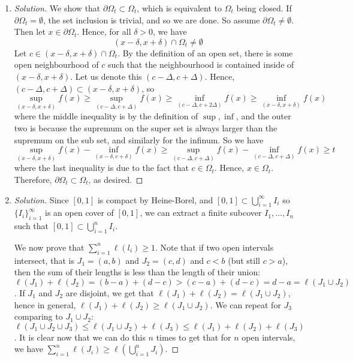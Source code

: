 \documentclass{article}
\begin{document}
\begin{enumerate}
\begin{proof}[Solution]
		Hence, $\omega_f(c) > 0$ for all $c \in [0,1]$.
	\end{proof}
	\item \begin{proof}[Solution]\let\qed\relax
		We show that $\partial \Omega_t \subset \Omega_t$,
		which is equivalent to $\Omega_t$ being closed.
		If $\partial\Omega_t = \emptyset$, the set inclusion is trivial,
		and so we are done.
		So assume $\partial \Omega_t \neq \emptyset$.
		Then let $x \in \partial \Omega_t$.
		Hence, for all $\delta > 0$, we have
		\[
			(x-\delta,x+\delta) \cap \Omega_t \neq \emptyset
		\]
		Let $c \in (x-\delta,x+\delta) \cap \Omega_t$.
		By the definition of an open set,
		there is some open neighbourhood of $c$ such that the neighbourhood is contained
		inside of $(x - \delta, x + \delta)$.
		Let us denote this $(c - \Delta, c + \Delta)$.
		Hence, $(c - \Delta, c+ \Delta) \subset (x - \delta, x+ \delta)$, so
		\[
			\sup_{(x-\delta,x+\delta)}f(x) \geq \sup_{(c-\Delta,c+\Delta)}f(x)
			\geq
			\inf_{(c-\Delta,c+2\Delta)}f(x) \geq
			\inf_{(x-\delta,x+\delta)}f(x)
		\]
		where the middle inequality is by the definition of $\sup,\inf$,
		and the outer two is because the supremum on the super set is always larger
		than the supremum on the sub set, and similarly for the infinum.
		So we have
		\[
			\sup_{(x-\delta,x+\delta)}f(x) - \inf_{(x-\delta,c+\delta)}f(x)
			\geq 
			\sup_{(c-\Delta,c+\Delta)}f(x) - \inf_{(c-\Delta,c+\Delta)}f(x)
			\geq t
		\]
		where the last inequality is due to the fact that $c \in \Omega_t$.
		Hence, $x \in \Omega_t$.
		Therefore, $\partial \Omega_t \subset \Omega_t$, as desired.
	\end{proof}
	\item \begin{proof}[Solution]\let\qed\relax
		Since $[0,1]$ is compact by Heine-Borel,
		and $[0,1] \subset \bigcup_{i=1}^\infty I_i$
		so $\{I_i\}_{i=1}^\infty$ is an open cover of $[0,1]$,
		we can extract a finite subcover
		$I_1,\dots,I_n$ such that $[0,1] \subset \bigcup_{i=1}^n I_i$.

		We now prove that $\sum_{i=1}^n \ell(l_i) \geq 1$.
		Note that if two open intervals intersect,
		that is $J_1 = (a,b)$ and $J_2 = (c,d)$ and $c < b$
		(but still $c > a$),
		then the sum of their lengths is less than the
		length of their union:
		$\ell(J_1) + \ell(J_2) = (b-a) + (d - c)
		> (c-a) + (d - c) = d - a = \ell(J_1 \cup J_2)$.
		If $J_1$ and $J_2$ are disjoint, we get that
		$\ell(J_1) + \ell(J_2) = \ell(J_1 \cup J_2)$,
		hence in general,
		$\ell(J_1) + \ell(J_2) \geq \ell(J_1 \cup J_2)$.
		We can repeat for $J_3$ comparing to $J_1 \cup J_2$:
		$\ell(J_1 \cup J_2 \cup J_3) \leq \ell(J_1 \cup J_2) + \ell(J_3)
		\leq \ell(J_1) + \ell(J_2) + \ell(J_3)$.
		It is clear now that we can do this $n$ times to get
		that for $n$ open intervals, we have
		$\sum_{i=1}^n \ell(J_i) \geq \ell(\bigcup_{i=1}^n J_i)$.


\end{proof}
\end{enumerate}
\end{document}
